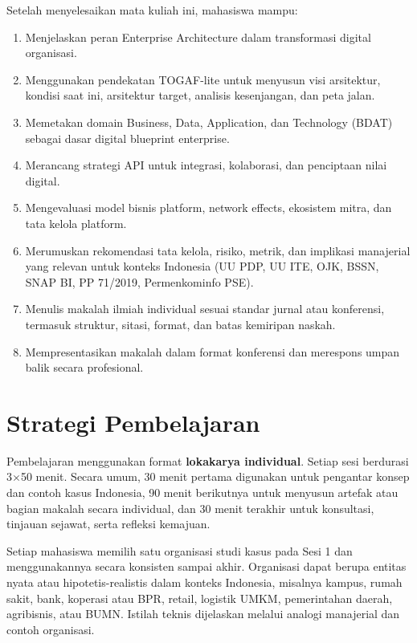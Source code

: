 Setelah menyelesaikan mata kuliah ini, mahasiswa mampu:

\begin{enumerate}
    \item Menjelaskan peran Enterprise Architecture dalam transformasi digital
    organisasi.
    \item Menggunakan pendekatan TOGAF-lite untuk menyusun visi arsitektur,
    kondisi saat ini, arsitektur target, analisis kesenjangan, dan peta jalan.
    \item Memetakan domain Business, Data, Application, dan Technology (BDAT)
    sebagai dasar digital blueprint enterprise.
    \item Merancang strategi API untuk integrasi, kolaborasi, dan penciptaan
    nilai digital.
    \item Mengevaluasi model bisnis platform, network effects, ekosistem mitra,
    dan tata kelola platform.
    \item Merumuskan rekomendasi tata kelola, risiko, metrik, dan implikasi
    manajerial yang relevan untuk konteks Indonesia (UU PDP, UU ITE, OJK, BSSN,
    SNAP BI, PP 71/2019, Permenkominfo PSE).
    \item Menulis makalah ilmiah individual sesuai standar jurnal atau
    konferensi, termasuk struktur, sitasi, format, dan batas kemiripan naskah.
    \item Mempresentasikan makalah dalam format konferensi dan merespons umpan
    balik secara profesional.
\end{enumerate}

\section{Strategi Pembelajaran}

Pembelajaran menggunakan format \textbf{lokakarya individual}. Setiap sesi
berdurasi 3$\times$50 menit. Secara umum, 30 menit pertama digunakan untuk
pengantar konsep dan contoh kasus Indonesia, 90 menit berikutnya untuk
menyusun artefak atau bagian makalah secara individual, dan 30 menit terakhir
untuk konsultasi, tinjauan sejawat, serta refleksi kemajuan.

Setiap mahasiswa memilih satu organisasi studi kasus pada Sesi 1 dan
menggunakannya secara konsisten sampai akhir. Organisasi dapat berupa entitas
nyata atau hipotetis-realistis dalam konteks Indonesia, misalnya kampus, rumah
sakit, bank, koperasi atau BPR, retail, logistik UMKM, pemerintahan daerah,
agribisnis, atau BUMN. Istilah teknis dijelaskan melalui analogi manajerial dan
contoh organisasi.

